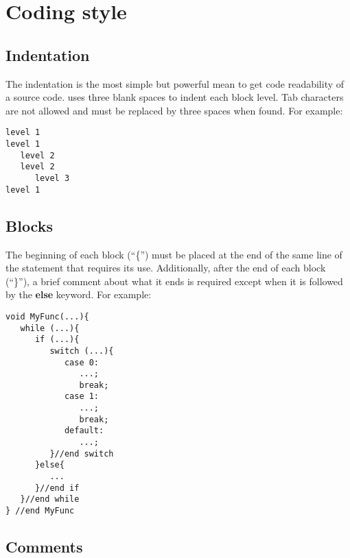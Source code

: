 \section{Coding style}
\label{sec:coding.style}

\subsection{Indentation}
\label{sec:coding.indent}

The indentation is the most simple but powerful mean to get code readability of a source code. \libname{ } uses three blank spaces to indent each block level. Tab characters are not allowed and must be replaced by three spaces when found. For example:

\begin{code}
\begin{verbatim}
level 1
level 1
   level 2
   level 2
      level 3
level 1
\end{verbatim}
\end{code}

\subsection{Blocks}
\label{sec:coding.blocks}

The beginning of each block (``\{'') must be placed at the end of the same line of the statement that requires its use. Additionally, after the end of each block (``\}''), a brief comment about what it ends is required except when it is followed by the {\bf else} keyword. For example:

\begin{code}
\begin{verbatim}
void MyFunc(...){
   while (...){
      if (...){
         switch (...){
            case 0:
               ...;
               break;
            case 1:
               ...;
               break;
            default:
               ...;
         }//end switch      
      }else{
         ...      
      }//end if
   }//end while
} //end MyFunc
\end{verbatim}
\end{code}

\subsection{Comments}
\label{sec:coding.comments}


